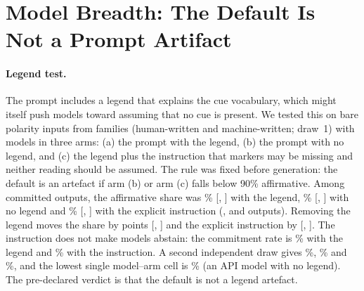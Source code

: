 \appendix
\section{Model Breadth: The Default Is Not a Prompt Artifact}\label{sec:robust}

\paragraph{Legend test.}
The prompt includes a legend that explains the cue vocabulary, which might itself push models toward assuming that no cue is present. We tested this on bare polarity inputs from \jmlegFamilies{} families (human-written and machine-written; draw~1) with \jmbreadthOrigModels{} models in three arms: (a) the prompt with the legend, (b) the prompt with no legend, and (c) the legend plus the instruction that markers may be missing and neither reading should be assumed. The rule was fixed before generation: the default is an artefact if arm (b) or arm (c) falls below 90\% affirmative. Among committed outputs, the affirmative share was \jmlegendAff{}\% [\jmlegendAffLo{}, \jmlegendAffHi{}] with the legend, \jmlegendNoLegendAff{}\% [\jmlegendNoLegendAffLo{}, \jmlegendNoLegendAffHi{}] with no legend and \jmlegC{}\% [\jmlegCLo{}, \jmlegCHi{}] with the explicit instruction (\jmlegAN{}, \jmlegBN{} and \jmlegCN{} outputs). Removing the legend moves the share by \jmlegBminusA{} points [\jmlegBminusALo{}, \jmlegBminusAHi{}] and the explicit instruction by \jmlegCminusA{} [\jmlegCminusALo{}, \jmlegCminusAHi{}]. The instruction does not make models abstain: the commitment rate is \jmlegACommit{}\% with the legend and \jmlegCCommit{}\% with the instruction. A second independent draw gives \jmlegDrawTwoA{}\%, \jmlegDrawTwoB{}\% and \jmlegDrawTwoC{}\%, and the lowest single model--arm cell is \jmlegMinModelNoLegend{}\% (an API model with no legend). The pre-declared verdict is that the default is not a legend artefact.

